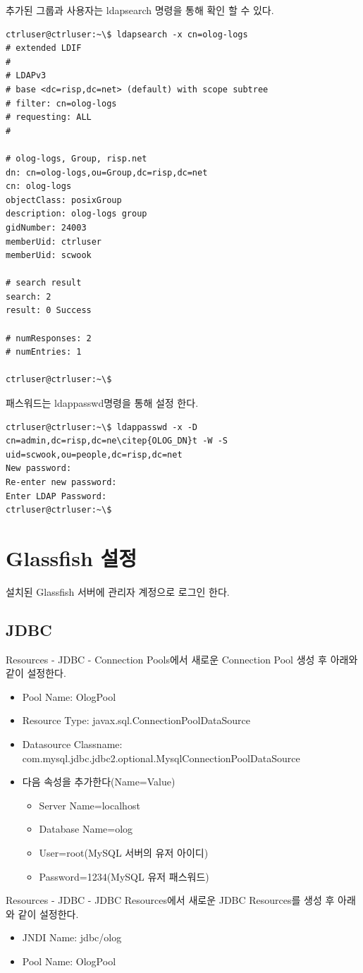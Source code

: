 \documentclass[11pt
  , a4paper
  , article
  , oneside
]{memoir}
\begin{document}
추가된 그룹과 사용자는 ldapsearch 명령을 통해 확인 할 수 있다.
\begin{lstlisting}[style=termstyle]
ctrluser@ctrluser:~\$ ldapsearch -x cn=olog-logs
# extended LDIF
#
# LDAPv3
# base <dc=risp,dc=net> (default) with scope subtree
# filter: cn=olog-logs
# requesting: ALL
#

# olog-logs, Group, risp.net
dn: cn=olog-logs,ou=Group,dc=risp,dc=net
cn: olog-logs
objectClass: posixGroup
description: olog-logs group
gidNumber: 24003
memberUid: ctrluser
memberUid: scwook

# search result
search: 2
result: 0 Success

# numResponses: 2
# numEntries: 1

ctrluser@ctrluser:~\$
\end{lstlisting}
패스워드는 ldappasswd명령을 통해 설정 한다.
\begin{lstlisting}[style=termstyle]
ctrluser@ctrluser:~\$ ldappasswd -x -D cn=admin,dc=risp,dc=ne\citep{OLOG_DN}t -W -S uid=scwook,ou=people,dc=risp,dc=net
New password: 
Re-enter new password:
Enter LDAP Password:
ctrluser@ctrluser:~\$
\end{lstlisting}

\section{Glassfish 설정}
설치된 Glassfish 서버에 관리자 계정으로 로그인 한다.
\subsection{JDBC}
Resources - JDBC - Connection Pools에서 새로운 Connection Pool 생성 후 
아래와 같이 설정한다.
\begin{itemize}
\item Pool Name: OlogPool
\item Resource Type: javax.sql.ConnectionPoolDataSource
\item Datasource Classname: com.mysql.jdbc.jdbc2.optional.MysqlConnectionPoolDataSource
\item 다음 속성을 추가한다(Name=Value)
  \begin{itemize}
  \item Server Name=localhost
  \item Database Name=olog
  \item User=root(MySQL 서버의 유저 아이디)
  \item Password=1234(MySQL 유저 패스워드)
  \end{itemize}
\end{itemize}
Resources - JDBC - JDBC Resources에서 새로운 JDBC Resources를 생성 후 
아래와 같이 설정한다.
\begin{itemize}
\item JNDI Name: jdbc/olog
\item Pool Name: OlogPool
\end{itemize}
\end{document}

